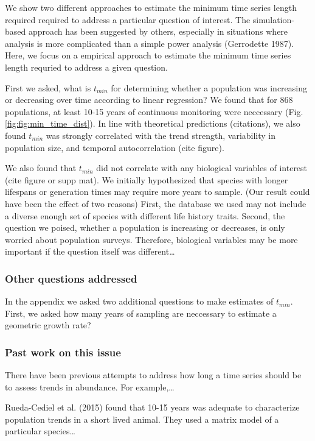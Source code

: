 \documentclass[12pt,]{article}
\begin{document}
We show two different approaches to estimate the minimum time series
length required required to address a particular question of interest.
The simulation-based approach has been suggested by others, especially
in situations where analysis is more complicated than a simple power
analysis (Gerrodette 1987). Here, we focus on a empirical approach to
estimate the minimum time series length requried to address a given
question.

First we asked, what is \(t_{min}\) for determining whether a population
was increasing or decreasing over time according to linear regression?
We found that for 868 populations, at least 10-15 years of continuous
monitoring were neccessary (Fig. \ref{fig:fig:min_time_dist}). In line
with theoretical predictions (citations), we also found \(t_{min}\) was
strongly correlated with the trend strength, variability in population
size, and temporal autocorrelation (cite figure).

We also found that \(t_{min}\) did not correlate with any biological
variables of interest (cite figure or supp mat). We initially
hypothesized that species with longer lifespans or generation times may
require more years to sample. (Our result could have been the effect of
two reasons) First, the database we used may not include a diverse
enough set of species with different life history traits. Second, the
question we poised, whether a population is increasing or decreases, is
only worried about population surveys. Therefore, biological variables
may be more important if the question itself was different\ldots{}

\subsubsection{Other questions
addressed}\label{other-questions-addressed}

In the appendix we asked two additional questions to make estimates of
\(t_{min}\). First, we asked how many years of sampling are neccessary
to estimate a geometric growth rate?

\subsubsection{Past work on this issue}\label{past-work-on-this-issue}

There have been previous attempts to address how long a time series
should be to assess trends in abundance. For example,\ldots{}

Rueda-Cediel et al. (2015) found that 10-15 years was adequate to
characterize population trends in a short lived animal. They used a
matrix model of a particular species\ldots{}
\end{document}
